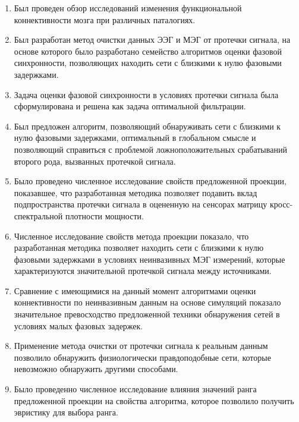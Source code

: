 \begin{enumerate}
  \item Был проведен обзор исследований изменения функциональной коннективности
      мозга при различных паталогиях.
  \item Был разработан метод очистки данных ЭЭГ и МЭГ от протечки сигнала, на
      основе которого было разработано семейство алгоритмов оценки фазовой синхронности,
      позволяющих находить сети с близкими к нулю фазовыми задержками.
  \item Задача оценки фазовой синхронности в условиях протечки сигнала была
      сформулирована и решена как задача оптимальной фильтрации.
  \item Был предложен алгоритм, позволяющий обнаруживать сети с близкими
      к нулю фазовыми задержками, оптимальный в глобальном смысле и позволяющий
      справиться с проблемой ложноположительных срабатываний второго рода, вызванных
      протечкой сигнала.
  \item Было проведено численное исследование свойств предложенной
      проекции, показавшее, что разработанная методика позволяет
      подавить вклад подпространства протечки сигнала в оцененную
      на сенсорах матрицу кросс-спектральной плотности мощности.
  \item Численное исследование свойств метода проекции показало, что
      разработанная методика позволяет находить сети с близкими к нулю фазовыми задержками в условиях
      неинвазивных МЭГ измерений, которые характеризуются значительной протечкой
      сигнала между источниками.
  \item Сравнение с имеющимися на данный момент алгоритмами оценки коннективности
      по неинвазивным данным на основе симуляций показало значительное превосходство
      предложенной техники обнаружения сетей в условиях малых фазовых задержек.
  \item Применение метода очистки от протечки сигнала к реальным данным позволило
      обнаружить физиологически правдоподобные сети, которые невозможно обнаружить
      другими способами.
  \item Было проведенно численное исследование влияния значений ранга предложенной проекции
      на свойства алгоритма, которое позволило получить эвристику для выбора ранга.

\end{enumerate}
